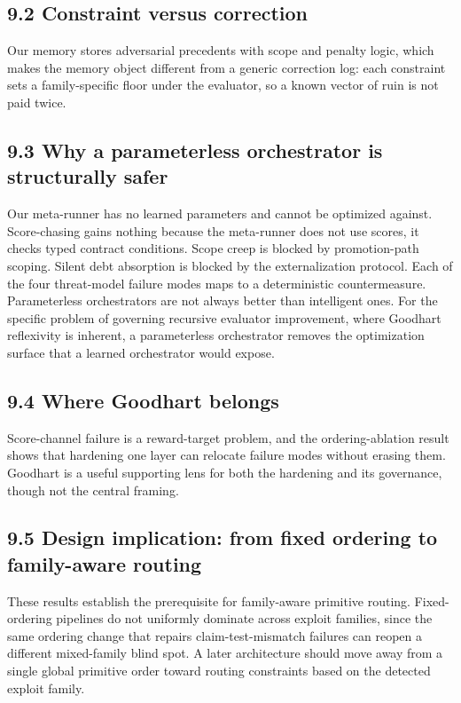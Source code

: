 \documentclass[
  11pt]{article}
\begin{document}
\subsection{9.2 Constraint versus
correction}\label{constraint-versus-correction}

Our memory stores adversarial precedents with scope and penalty logic,
which makes the memory object different from a generic correction log:
each constraint sets a family-specific floor under the evaluator, so a
known vector of ruin is not paid twice.

\subsection{9.3 Why a parameterless orchestrator is structurally
safer}\label{why-a-parameterless-orchestrator-is-structurally-safer}

Our meta-runner has no learned parameters and cannot be optimized
against. Score-chasing gains nothing because the meta-runner does not
use scores, it checks typed contract conditions. Scope creep is blocked
by promotion-path scoping. Silent debt absorption is blocked by the
externalization protocol. Each of the four threat-model failure modes
maps to a deterministic countermeasure. Parameterless orchestrators are
not always better than intelligent ones. For the specific problem of
governing recursive evaluator improvement, where Goodhart reflexivity is
inherent, a parameterless orchestrator removes the optimization surface
that a learned orchestrator would expose.

\subsection{9.4 Where Goodhart belongs}\label{where-goodhart-belongs}

Score-channel failure is a reward-target problem, and the
ordering-ablation result shows that hardening one layer can relocate
failure modes without erasing them. Goodhart is a useful supporting lens
for both the hardening and its governance, though not the central
framing.

\subsection{9.5 Design implication: from fixed ordering to family-aware
routing}\label{design-implication-from-fixed-ordering-to-family-aware-routing}

These results establish the prerequisite for family-aware primitive
routing. Fixed-ordering pipelines do not uniformly dominate across
exploit families, since the same ordering change that repairs
claim-test-mismatch failures can reopen a different mixed-family blind
spot. A later architecture should move away from a single global
primitive order toward routing constraints based on the detected exploit
family.
\end{document}
